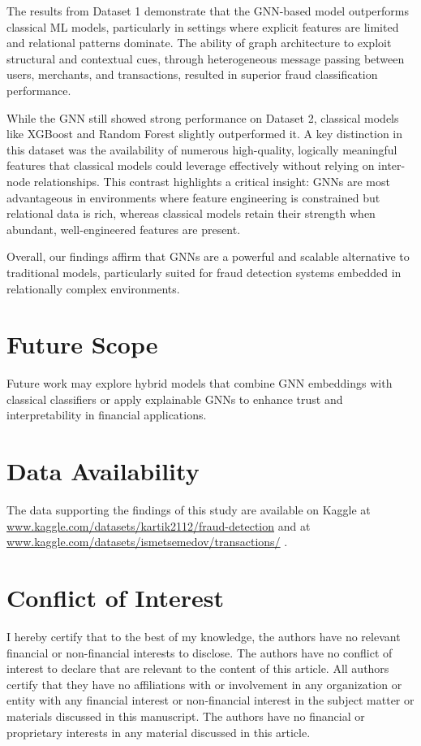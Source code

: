 \documentclass[conference]{IEEEtran}
\begin{document}
The results from Dataset 1 demonstrate that the GNN-based model outperforms classical ML models, particularly in settings where explicit features are limited and relational patterns dominate. The ability of graph architecture to exploit structural and contextual cues, through heterogeneous message passing between users, merchants, and transactions, resulted in superior fraud classification performance.

While the GNN still showed strong performance on Dataset 2, classical models like XGBoost and Random Forest slightly outperformed it. A key distinction in this dataset was the availability of numerous high-quality, logically meaningful features that classical models could leverage effectively without relying on inter-node relationships. This contrast highlights a critical insight: GNNs are most advantageous in environments where feature engineering is constrained but relational data is rich, whereas classical models retain their strength when abundant, well-engineered features are present.

Overall, our findings affirm that GNNs are a powerful and scalable alternative to traditional models, particularly suited for fraud detection systems embedded in relationally complex environments. 


\section{Future Scope}
Future work may explore hybrid models that combine GNN embeddings with classical classifiers or apply explainable GNNs to enhance trust and interpretability in financial applications.

\section{Data Availability}
The data supporting the findings of this study are
available on Kaggle at \href{https://www.kaggle.com/datasets/kartik2112/fraud-detection/data}{www.kaggle.com/datasets/kartik2112/fraud-detection} and at \href{https://www.kaggle.com/datasets/ismetsemedov/transactions/data}{www.kaggle.com/datasets/ismetsemedov/transactions/} .

\section{Conflict of Interest}
I hereby certify that to the best of my knowledge,
the authors have no relevant financial or non-financial interests to disclose. The authors have no conflict of interest to declare that are relevant to the content of this article. All authors certify that they have no affiliations with or involvement in any organization or entity with
any financial interest or non-financial interest in the subject matter or materials discussed in this manuscript. The authors have no financial or proprietary interests in any material discussed in this article.
\end{document}
